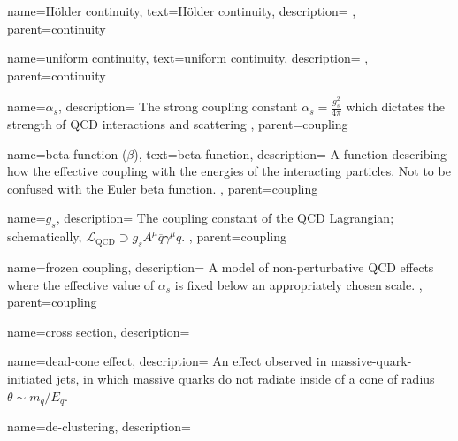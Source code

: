     {
        name=H\"older continuity,
        text=H\"older continuity,
        description={
        },
        parent=continuity
    }


    {
        name=uniform continuity,
        text=uniform continuity,
        description={
        },
        parent=continuity
    }



    {
      name=\ensuremath{\alpha_s},
      description={
          The strong coupling constant \(\alpha_s = \frac{g_s^2}{4\pi}\) which dictates the strength of QCD interactions and scattering
    },
    parent=coupling
    }

    {
        name=beta function (\ensuremath{\beta}),
        text=beta function,
        description={%
            A function describing how the effective coupling with the energies of the interacting particles.
            Not to be confused with the Euler beta function.
        },
        parent=coupling
    }

    {
      name=\ensuremath{g_s},
      description={
          The coupling constant of the QCD Lagrangian;
          schematically, \(\mathcal{L}_\text{QCD} \supset g_s A^\mu \overline{q} \gamma^\mu q\).
      },
      parent=coupling
    }


    {
      name=frozen coupling,
      description={
          A model of non-perturbative QCD effects where the effective value of \(\alpha_s\) is fixed below an appropriately chosen scale.
      },
      parent=coupling
    }




{
    name=cross section,
    description={
    }
}


{
    name=dead-cone effect,
    description={
        An effect observed in massive-quark-initiated jets, in which massive quarks do not radiate inside of a cone of radius \(\theta \sim m_q/E_q\).
    }
}


{
    name=de-clustering,
    description={
    }
}




